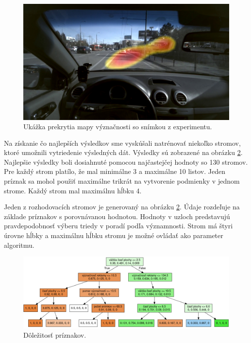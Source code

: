 \begin{figure}[H]
    \centering
    \includegraphics[width=1\textwidth]{images/05/sal_frame.jpg}
    \caption{Ukážka prekrytia mapy význačnosti so snímkou z experimentu.}
    \label{img:salmap}
\end{figure}



Na získanie čo najlepších výsledkov sme vyskúšali natrénovať niekoľko stromov, ktoré umožnili vytriedenie výsledných dát. Výsledky sú zobrazené na obrázku \ref{img:tree}. Najlepšie výsledky boli dosiahnuté pomocou najčastejčej hodnoty so 130 stromov. Pre každý strom platílo, že mal minimálne 3 a maximálne 10 listov. Jeden príznak sa mohol použiť maximálne trikrát na vytvorenie podmienky v jednom strome. Každý strom mal maximálnu hĺbku 4.

Jeden z rozhodovacích stromov je generovaný na obrázku \ref{img:tree}. Údaje rozdeľuje na základe príznakov s porovnávanou hodnotou. Hodnoty v uzloch predstavujú pravdepodobnosť výberu triedy v poradí podľa významnosti. Strom má štyri úrovne hĺbky a maximálnu hĺbku stromu je možné ovládať ako parameter algoritmu.

\begin{figure}[H]
    \centering
    \includegraphics[width=1\textwidth]{images/05/tree.png}
    \caption{Dôležitosť príznakov.}
    \label{img:tree}
\end{figure}

